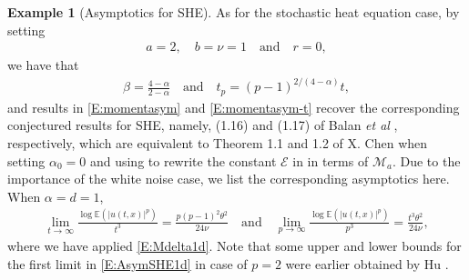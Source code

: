 \documentclass[12pt]{report}
\theoremstyle{plain}
\theoremstyle{definition}
\newtheorem{example}[theorem]{Example}
\numberwithin{equation}{section}
\newcommand{\E}{\mathbb{E}}
\begin{document}
\begin{example}[Asymptotics for SHE]
	\label{Eg:AsymSHE} As for the stochastic heat equation case, by setting
	\begin{align*}
	a = 2,\quad b= \nu = 1 \quad \text{and} \quad r = 0,
	\end{align*}
	we have that
	\begin{align*}
	\beta = \frac{4-\alpha}{2-\alpha} \quad \text{and} \quad
	t_p=(p-1)^{2/(4-\alpha)}t,
	\end{align*}
	and results in \eqref{E:momentasym} and \eqref{E:momentasym-t} recover the corresponding
	conjectured results for SHE, namely, (1.16) and (1.17) of Balan {\it et al} \cite{balan.chen.ea:22:exact},
	respectively, which are equivalent to Theorem 1.1 and 1.2 of X. Chen \cite{chen:17:moment} when
	setting $\alpha_0=0$ and using \cite[Lemma A.2]{chen.hu.ea:15:exponential} to rewrite the constant $\mathcal{E}$ in \cite{chen:17:moment} in terms of $\mathcal{M}_a$. Due to the importance of the white noise case, we
	list the corresponding asymptotics here. When $\alpha=d=1$,
	\begin{align} \label{E:AsymSHE1d}
	\lim_{t \to \infty} \frac{\log \E\left(|u(t,x)|^p\right)}{t^3} = \frac{p(p-1)^2\theta^2}{24\nu}
	\quad \text{and} \quad
	\lim_{p \to \infty} \frac{\log \E\left(|u(t,x)|^p\right)}{p^3} = \frac{t^3\theta^2}{24\nu},
	\end{align}
	where we have applied \eqref{E:Mdelta1d}. Note that some upper and lower bounds for the first
	limit in \eqref{E:AsymSHE1d} in case of $p=2$ were earlier obtained by Hu \cite[part 1) of Theorem
	4.1]{hu:02:chaos}.
\end{example}
\end{document}

